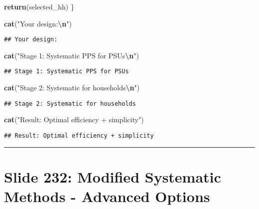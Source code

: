 \documentclass[
]{article}
\newenvironment{Shaded}{\begin{snugshade}}{\end{snugshade}}
\newcommand{\FunctionTok}[1]{\textcolor[rgb]{0.13,0.29,0.53}{\textbf{#1}}}
\newcommand{\NormalTok}[1]{#1}
\newcommand{\SpecialCharTok}[1]{\textcolor[rgb]{0.81,0.36,0.00}{\textbf{#1}}}
\newcommand{\StringTok}[1]{\textcolor[rgb]{0.31,0.60,0.02}{#1}}
\begin{document}
\begin{Shaded}
\begin{Highlighting}[]
  \FunctionTok{return}\NormalTok{(selected\_hh)}
\NormalTok{\}}

\FunctionTok{cat}\NormalTok{(}\StringTok{"Your design:}\SpecialCharTok{\textbackslash{}n}\StringTok{"}\NormalTok{)}
\end{Highlighting}
\end{Shaded}

\begin{verbatim}
## Your design:
\end{verbatim}

\begin{Shaded}
\begin{Highlighting}[]
\FunctionTok{cat}\NormalTok{(}\StringTok{"Stage 1: Systematic PPS for PSUs}\SpecialCharTok{\textbackslash{}n}\StringTok{"}\NormalTok{)}
\end{Highlighting}
\end{Shaded}

\begin{verbatim}
## Stage 1: Systematic PPS for PSUs
\end{verbatim}

\begin{Shaded}
\begin{Highlighting}[]
\FunctionTok{cat}\NormalTok{(}\StringTok{"Stage 2: Systematic for households}\SpecialCharTok{\textbackslash{}n}\StringTok{"}\NormalTok{)}
\end{Highlighting}
\end{Shaded}

\begin{verbatim}
## Stage 2: Systematic for households
\end{verbatim}

\begin{Shaded}
\begin{Highlighting}[]
\FunctionTok{cat}\NormalTok{(}\StringTok{"Result: Optimal efficiency + simplicity"}\NormalTok{)}
\end{Highlighting}
\end{Shaded}

\begin{verbatim}
## Result: Optimal efficiency + simplicity
\end{verbatim}

\begin{center}\rule{0.5\linewidth}{0.5pt}\end{center}

\section{Slide 232: Modified Systematic Methods - Advanced
Options}\label{slide-232-modified-systematic-methods---advanced-options}
\end{document}
